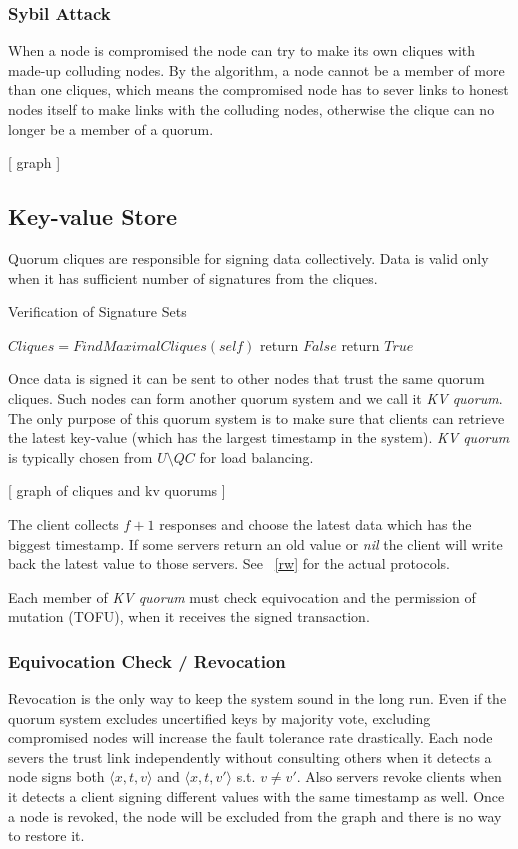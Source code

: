 \documentclass[twoside,twocolumn,10pt,fleqn]{article}
\begin{document}
\subsubsection*{Sybil Attack}
When a node is compromised the node can try to make its own cliques
with made-up colluding nodes. By the algorithm, a node cannot be a
member of more than one cliques, which means the compromised node has
to sever links to honest nodes itself to make links with the colluding
nodes, otherwise the clique can no longer be a member of a quorum.

[ graph ]

\subsection{Key-value Store}
Quorum cliques are responsible for signing data collectively. Data is
valid only when it has sufficient number of signatures from the
cliques. 

\begin{algorithm}
  \caption{Verification of Signature Sets}
  \SetAlgoNoLine
  $Cliques = FindMaximalCliques(self)$\;
  {
    {
      return $False$\;
    }
  }
  return $True$\;
\end{algorithm}

Once data is signed it can be sent to other nodes that trust the same
quorum cliques. Such nodes can form another quorum system and we call
it {\em KV quorum}. The only purpose of this quorum system is to make
sure that clients can retrieve the latest key-value (which has the
largest timestamp in the system). {\em KV quorum} is typically chosen
from $U \setminus QC$ for load balancing.

[ graph of cliques and kv quorums ]

The client collects $f + 1$ responses and choose the latest data which
has the biggest timestamp. If some servers return an old value or {\em
  nil} the client will write back the latest value to those
servers. See ~\ref{rw} for the actual protocols.

Each member of {\em KV quorum} must check equivocation and the
permission of mutation (TOFU), when it receives the signed
transaction.

\subsubsection*{Equivocation Check / Revocation}
Revocation is the only way to keep the system sound in the long
run. Even if the quorum system excludes uncertified keys by majority
vote, excluding compromised nodes will increase the fault tolerance
rate drastically.
Each node severs the trust link independently without consulting
others when it detects a node signs both $\langle x,t,v \rangle$ and
$\langle x,t,v' \rangle$ s.t.  $v \neq v'$. Also servers revoke
clients when it detects a client signing different values with the
same timestamp as well. Once a node is revoked, the node will be
excluded from the graph and there is no way to restore it.
\end{document}
